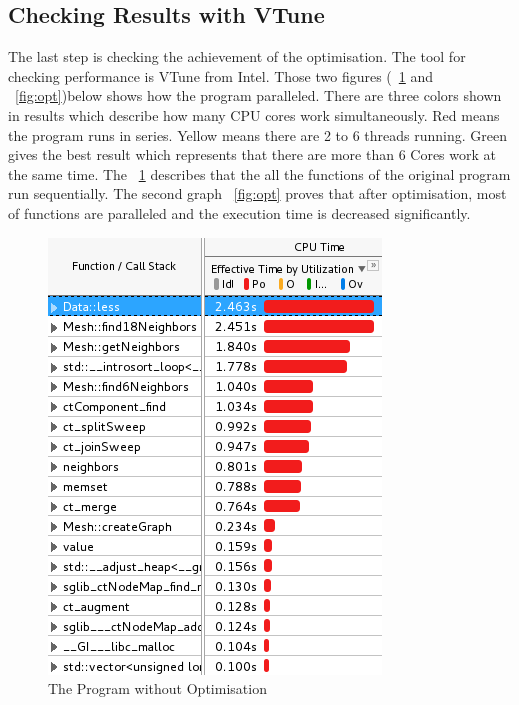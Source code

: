 \documentclass[conference]{IEEEtran}
\newcommand{\fref}[1]{\figurename~\ref{#1}}
\begin{document}
\subsection{Checking Results with VTune}
The last step is checking the achievement of the optimisation. The tool for checking performance is VTune from Intel. Those two figures (\fref{fig:noopt} and \fref{fig:opt})below shows how the program  paralleled. There are three colors shown in results which describe how many CPU cores work simultaneously. Red means the program runs in series. Yellow means there are 2 to 6 threads running. Green gives the best result which represents that there are more than 6 Cores work at the same time. The \fref{fig:noopt} describes that the all the functions of the original program run sequentially. The second graph \fref{fig:opt} proves that after optimisation, most of functions are paralleled and the execution time is decreased significantly. 
\begin{figure}[!h]
	\centering
	\includegraphics[width=\columnwidth]{noopt_vtune}
	\caption{The Program without Optimisation}
	\label{fig:noopt}
\end{figure}
\end{document}
